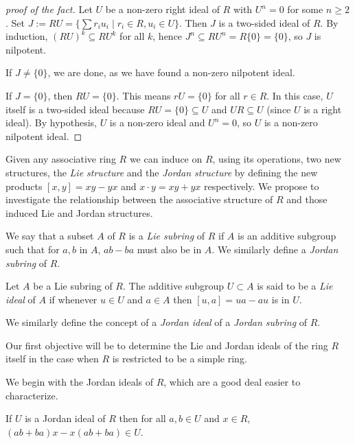 \documentclass{article}
\begin{document}
\begin{tcolorbox}[colback=gray!20, colframe=black] 
\begin{proof}[proof of the fact] 
Let $U$ be a non-zero right ideal of $R$ with $U^n = 0$ for some $n \geq 2$.  
Set $J := RU = \{ \sum r_i u_i \mid r_i \in R, u_i \in U \}$. Then $ J $ is a two-sided ideal of $ R $. By induction, $(RU)^k \subseteq R U^k$ for all $k$, hence $J^n \subseteq R U^n = R\{0\} = \{0\}$, so $J$ is nilpotent.    
 
If $J \neq \{0\}$, we are done, as we have found a non-zero nilpotent ideal.  

If $J = \{0\}$, then $RU = \{0\}$. This means $rU = \{0\}$ for all $r \in R$. In this case, $U$ itself is a two-sided ideal because $RU = \{0\} \subseteq U$ and $UR \subseteq U$ (since $U$ is a right ideal). By hypothesis, $U$ is a non-zero ideal and $U^n = 0$, so $U$ is a non-zero nilpotent ideal.  
\end{proof}
\end{tcolorbox}

Given any associative ring $ R $ we can induce on $ R $, using its operations, two new structures, the \emph{Lie structure} and the \emph{Jordan structure} by defining the new products $[x, y] = xy - yx$ and $x \cdot y = xy + yx$ respectively. We propose to investigate the relationship between the associative structure of $ R $ and those induced Lie and Jordan structures.  

We say that a subset $ A $ of $ R $ is a \emph{Lie subring} of $ R $ if $ A $ is an additive subgroup such that for $ a, b $ in $ A $, $ab - ba$ must also be in $ A $. We similarly define a \emph{Jordan subring} of $ R $.  

\begin{definition}\label{def:1.2}  
Let $ A $ be a Lie subring of $ R $. The additive subgroup $U \subset A$ is said to be a \emph{Lie ideal} of $ A $ if whenever $u \in U$ and $a \in A$ then $[u, a] = ua - au$ is in $ U $.  
\end{definition}  

We similarly define the concept of a \emph{Jordan ideal} of a \emph{Jordan subring} of $ R $.  

Our first objective will be to determine the Lie and Jordan ideals of the ring $ R $ itself in the case when $ R $ is restricted to be a simple ring.  

We begin with the Jordan ideals of $ R $, which are a good deal easier to characterize.  

\begin{lemma}\label{lem:1.3}  
 If $U$ is a Jordan ideal of $R$ then for all $a, b \in U$ and $x \in R$, $(ab + ba)x - x(ab + ba) \in U$.  
\end{lemma}  
\end{document}
